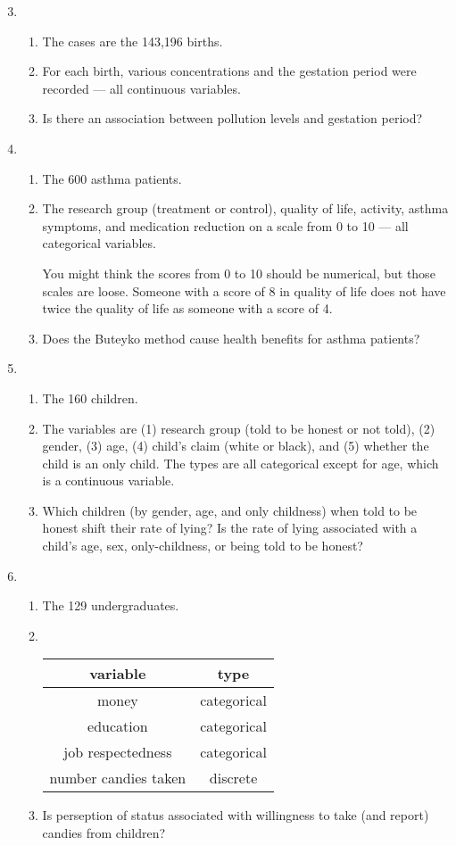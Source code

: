 \documentclass[12pt,letterpaper]{article}
\begin{document}
\begin{enumerate}
\setcounter{enumi}{2}
\item
\begin{enumerate}
\item The cases are the 143,196 births.
\item For each birth, various concentrations and the gestation period were recorded --- all continuous variables.
\item Is there an association between pollution levels and gestation period?
\end{enumerate}

\item 
\begin{enumerate}
\item The 600 asthma patients.
\item The research group (treatment or control), quality
of life, activity, asthma symptoms, and medication reduction on a scale from 0 to 10 --- all categorical variables.

You might think the scores from 0 to 10 should be numerical, but those scales are loose. Someone with a score of 8 in quality of life does not have twice the quality of life as someone with a score of 4.
\item Does the Buteyko method cause health benefits for asthma patients?
\end{enumerate}

\item
\begin{enumerate}
\item The 160 children.
\item The variables are (1) research group (told to be honest or not told), (2) gender, (3) age, (4) child's claim (white or black), and (5) whether the child is an only child. The types are all categorical except for age, which is a continuous variable.
\item Which children (by gender, age, and only childness) when told to be honest shift their rate of lying? Is the rate of lying associated with a child's age, sex, only-childness, or being told to be honest? 
\end{enumerate}

\item
\begin{enumerate}
\item The 129 undergraduates.
\item ~\\
\begin{tabular}{|c|c|}\hline
variable & type \\ \hline
money & categorical \\
education & categorical \\
job respectedness & categorical \\
number candies taken & discrete \\ \hline
\end{tabular}
\item Is perseption of status associated with willingness to take (and report) candies from children?
\end{enumerate}


\end{enumerate}
\end{document}
